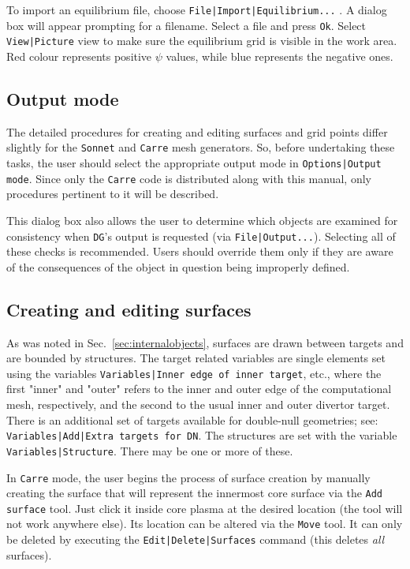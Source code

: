 \documentclass[a4paper,10pt]{report}
\begin{document}
To import an equilibrium file, choose {\tt File|Import|Equilibrium...} . A
dialog box will appear prompting for a filename. Select a file and
press {\tt Ok}.  Select {\tt View|Picture} view to make sure the
equilibrium grid is visible in the work area. Red colour represents
positive $\psi$ values, while blue represents the negative ones.

\subsection{Output mode}

The detailed procedures for creating and editing surfaces and grid
points differ slightly for the {\tt Sonnet} and {\tt Carre} mesh generators.
So, before undertaking these tasks, the user should select the
appropriate output mode in {\tt Options|Output mode}.
Since only the {\tt Carre} code is distributed along with this manual,
only procedures pertinent to it will be described.

This dialog box also allows the user to determine which objects are
examined for consistency when {\tt DG}'s output is requested
(via {\tt File|Output...}).  Selecting all of these
checks is recommended.  Users should override them only if they are
aware of the consequences of the object in question being improperly
defined.

\subsection{Creating and editing surfaces}
\label{sec:createsurfaces}

As was noted in Sec.~\ref{sec:internalobjects}, surfaces are drawn between
targets and are bounded by structures.
The target related variables are single elements set using the
variables
{\tt Variables|Inner edge of inner target}, etc.,
where the first "inner" and "outer" refers to the inner and outer edge
of the computational mesh, respectively, and the second to the
usual inner and outer divertor target.  There is an additional
set of targets available for double-null geometries; see:
{\tt Variables|Add|Extra targets for DN}.
The structures are set with the variable
{\tt Variables|Structure}.  There may be one or more
of these.

In {\tt Carre} mode, the user begins the process of surface creation by manually
creating the surface that will represent the innermost core surface
via the {\tt Add surface} tool.
Just click it inside core plasma at the
desired location (the tool will not work anywhere else).
Its location can be altered via the {\tt Move}
tool.  It can only be deleted
by executing the {\tt Edit|Delete|Surfaces} command
(this deletes {\em all} surfaces).
\end{document}
